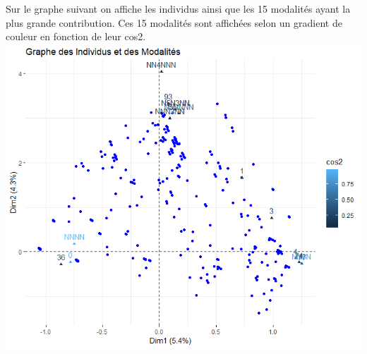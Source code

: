 \documentclass{book}
\begin{document}
\noindent
Sur le graphe suivant on affiche les individus ainsi que les 15 modalités ayant la plus grande contribution. Ces 15 modalités sont affichées selon un gradient de couleur en fonction de leur cos2. \\
\includegraphics[scale = 1]{ACM_var_ind.png}
\end{document}
